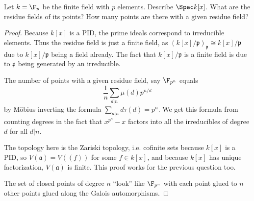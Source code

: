 \begin{exercise}
	Let $ k = \F_p $ be the finite field with $p $ elements. Describe $\Spec k[x] $. What are the residue fields of its points? How many points are there with a given residue field?
\end{exercise}
\begin{proof}
	Because $k[x] $ is a PID, the prime ideals correspond to irreducible elements.
	Thus the residue field is just a finite field, as $(k[x] / \mathfrak{p})_{\mathfrak{p}} \cong k[x] / \mathfrak{p}$ due to $k[x] / \mathfrak{p} $ being a field already.
	The fact that $k[x] / \mathfrak{p} $ is a finite field is due to $\mathfrak{p} $ being generated by an irreducible.

	The number of points with a given residue field, say $\F_{p^n} $ equals
	\[
		\frac{1}{n}\sum_{d | n} \mu(d) p^{n / d} 
	\] 
	by M\"obius inverting the formula $\sum_{d | n} d\tau (d) = p^n $.
	We get this formula from counting degrees in the fact that $x^{p^n} - x  $ factors into all the irreducibles of degree $d $ for all $d|n $.

	The topology here is the Zariski topology, i.e. cofinite sets because $k[x] $ is a PID, so $V(\mathfrak{a}) = V((f)) $ for some $f \in k[x] $, and because $k[x] $ has unique factorization, $V(\mathfrak{a}) $ is finite.
	This proof works for the previous question too.

	The set of closed points of degree $n $ ``look'' like $\F_{p^n} $ with each point glued to $n $ other points glued along the Galois automorphisms.
\end{proof}

